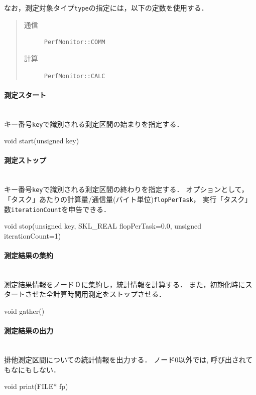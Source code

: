 なお，測定対象タイプ{\tt type}の指定には，以下の定数を使用する．
\begin{quote}
\begin{description}
 \item[通信] {\tt PerfMonitor::COMM}   
 \item[計算] {\tt PerfMonitor::CALC}
\end{description}
\end{quote}

\paragraph{測定スタート}\mbox{}\\
キー番号{\tt key}で識別される測定区間の始まりを指定する．
{\small
\begin{program}
void start(unsigned key)
\end{program}
}

\paragraph{測定ストップ}\mbox{}\\
キー番号{\tt key}で識別される測定区間の終わりを指定する．
オプションとして，「タスク」あたりの計算量/通信量(バイト単位){\tt flopPerTask}，
実行「タスク」数{\tt iterationCount}を申告できる．
{\small
\begin{program}
void stop(unsigned key, SKL_REAL flopPerTask=0.0, unsigned iterationCount=1)
\end{program}
}

\paragraph{測定結果の集約}\mbox{}\\
測定結果情報をノード０に集約し，統計情報を計算する．
また，初期化時にスタートさせた全計算時間用測定をストップさせる．
{\small
\begin{program}
void gather()
\end{program}
}

\paragraph{測定結果の出力}\mbox{}\\
排他測定区間についての統計情報を出力する．
ノード0以外では, 呼び出されてもなにもしない．
{\small
\begin{program}
void print(FILE* fp)
\end{program}
}

